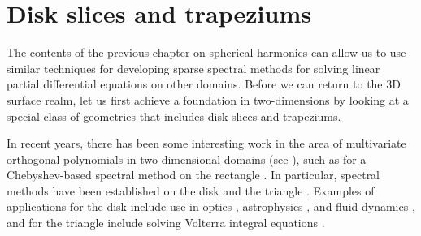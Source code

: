 

\chapter{Disk slices and trapeziums}\label{CHAPTER:diskslice}

The contents of the previous chapter on spherical harmonics can allow us to use similar techniques for developing sparse spectral methods for solving linear partial differential equations on other domains. Before we can return to the 3D surface realm, let us first achieve a foundation in two-dimensions by looking at a special class of geometries that includes disk slices and trapeziums.

In recent years, there has been some interesting work in the area of multivariate orthogonal polynomials in two-dimensional domains (see \cite{dunkl2014orthogonal}), such as for a Chebyshev-based spectral method on the rectangle \cite{julien2009efficient}. In particular, spectral methods have been established on the disk \cite{boyd2011comparing, vasil2016tensor} and the triangle \cite{olver2019triangle}. Examples of applications for the disk include use in optics \cite{mahajan2007orthonormal}, astrophysics \cite{pringle1981accretion}, and fluid dynamics \cite{eggels1994fully, noll1976zernike, kerswell2005recent}, and for the triangle include solving Volterra integral equations \cite{gutleb2020sparse}.

